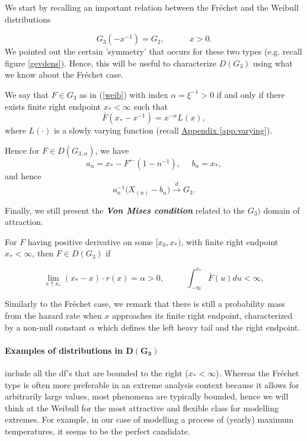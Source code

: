 We start by recalling an important relation between the Fréchet and the Weibull distributions 

\begin{equation*}
G_3(-x^{-1})=G_2, \qquad\quad x>0.
\end{equation*}
We pointed out the certain 'symmetry' that occurs for these two types (e.g. recall figure \ref{gevdens}). Hence, this will be useful to characterize $D(G_3)$ using what we know about the Fréchet case.

\begin{theorem}
We say that $F\in G_{3}$ as in (\ref{weib}) with index $\alpha=\xi^{-1}>0$ if and only if there exists finite right endpoint $x_*<\infty$ such that 
\begin{equation}
\bar{F}(x_*-x^{-1})=x^{-\alpha}L(x),
\end{equation}
where $L(\cdot)$ is a slowly varying function (recall \hyperref[app:varying]{Appendix \ref{app:varying}}).
\end{theorem}
Hence for $F\in D(G_{3,\alpha})$, we have 
\begin{equation*}
a_n=x_*-F^{\leftarrow}(1-n^{-1}), \ \  \ \ \ \ b_n=x_*,
\end{equation*}
and hence
\begin{equation*}
a^{-1}_n\Big(X_{(n)}-b_n\Big)\stackrel{d}{\rightarrow}G_{3}.
\end{equation*}

Finally, we still present the \emph{\textbf{Von Mises condition}} related to the $G_{3})$ domain of attraction. 

\begin{theorem} For $F$ having positive derivative on some $[x_0,x_*)$, with finite right endpoint $x_*<\infty$, then $F\in D(G_{3})$ if

\begin{equation}
\displaystyle{\lim_{ x  \uparrow  x_*}}(x_*-x)\cdot r(x)=\alpha >0, \ \ \ \ \ \ \ \ \ \     \ \
\int^{x_*}_{-\infty} \bar{F}(u)du<\infty,
\end{equation}
\end{theorem}
Similarly to the Fréchet case, we remark that there is still a probability mass from the hazard rate when $x$ approaches its finite right endpoint, characterized by a non-null constant $\alpha$ which defines the left heavy tail and the right endpoint.

\paragraph*{Examples of distributions in $\boldsymbol{D(G_{3})}$} include all the df's that are bounded to the right ($x_*<\infty$). Whereas the Fréchet type is often more preferable in an extreme analysis context because it allows for arbitrarily large values, most phenomena are typically bounded, hence we will think at the Weibull for the most attractive and flexible class for modelling extremes. For example, in our case of modelling a process of (yearly) maximum temperatures, it seems to be the perfect candidate.


